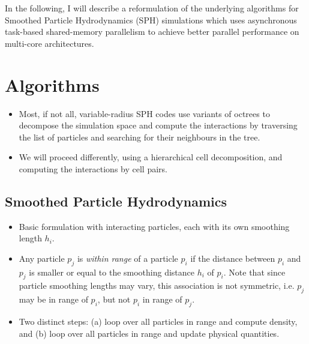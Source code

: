 \documentclass[final]{siamltex}
\begin{document}
In the following, I will describe a reformulation of the
underlying algorithms for Smoothed Particle Hydrodynamics (SPH)
simulations which uses asynchronous
task-based shared-memory parallelism to achieve better parallel
performance on multi-core architectures.


\section{Algorithms}

\begin{itemize}

    \item Most, if not all, variable-radius SPH codes use variants of
        octrees to decompose the simulation space and compute the
        interactions by traversing the list of particles and searching
        for their neighbours in the tree.
        
    \item We will proceed differently, using a hierarchical cell
        decomposition, and computing the interactions by cell pairs.
        
\end{itemize}


\subsection{Smoothed Particle Hydrodynamics}

\begin{itemize}

    \item Basic formulation with interacting particles, each with
        its own smoothing length $h_i$.
    
    \item Any particle $p_j$ is {\em within range} of a particle $p_i$
        if the distance between $p_i$ and $p_j$ is smaller or equal
        to the smoothing distance $h_i$ of $p_i$.
        Note that since particle smoothing lengths may vary, this
        association is not symmetric, i.e. $p_j$ may be in range of
        $p_i$, but not $p_i$ in range of $p_j$.
        
    \item Two distinct steps: (a) loop over all particles in range
        and compute density, and (b) loop over all particles in
        range and update physical quantities.

\end{itemize}
\end{document}
